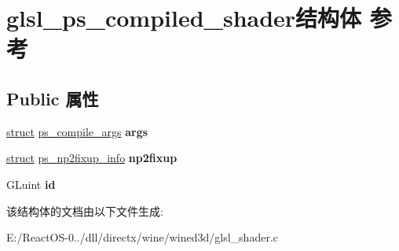 \hypertarget{structglsl__ps__compiled__shader}{}\section{glsl\+\_\+ps\+\_\+compiled\+\_\+shader结构体 参考}
\label{structglsl__ps__compiled__shader}
\subsection*{Public 属性}
\begin{DoxyCompactItemize}
\item 
\mbox{\label{structglsl__ps__compiled__shader_a9ba9c48eb23dd43587017d8ac85c7f8d}} 
\hyperlink{interfacestruct}{struct} \hyperlink{structps__compile__args}{ps\+\_\+compile\+\_\+args} {\bfseries args}
\item 
\mbox{\label{structglsl__ps__compiled__shader_afe26f1e38ca0b913092881eefabebc07}} 
\hyperlink{interfacestruct}{struct} \hyperlink{structps__np2fixup__info}{ps\+\_\+np2fixup\+\_\+info} {\bfseries np2fixup}
\item 
\mbox{\label{structglsl__ps__compiled__shader_ab192f24447021f81f2385219bf8814e8}} 
G\+Luint {\bfseries id}
\end{DoxyCompactItemize}


该结构体的文档由以下文件生成\+:\begin{DoxyCompactItemize}
\item 
E\+:/\+React\+O\+S-\/0../dll/directx/wine/wined3d/glsl\+\_\+shader.\+c\end{DoxyCompactItemize}
